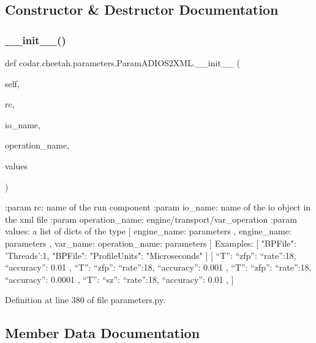 \subsection{Constructor \& Destructor Documentation}
\mbox{\label{classcodar_1_1cheetah_1_1parameters_1_1_param_a_d_i_o_s2_x_m_l_af754fa92a1b477dc6fedce88a9375d53}} 
\subsubsection{\texorpdfstring{\+\_\+\+\_\+init\+\_\+\+\_\+()}{\_\_init\_\_()}}
{\footnotesize\ttfamily def codar.\+cheetah.\+parameters.\+Param\+A\+D\+I\+O\+S2\+X\+M\+L.\+\_\+\+\_\+init\+\_\+\+\_\+ (\begin{DoxyParamCaption}\item[{}]{self,  }\item[{}]{rc,  }\item[{}]{io\+\_\+name,  }\item[{}]{operation\+\_\+name,  }\item[{}]{values }\end{DoxyParamCaption})}

\begin{DoxyVerb}:param rc: name of the run component
:param io_name: name of the io object in the xml file
:param operation_name: engine/transport/var_operation
:param values: a list of dicts of the type
[ { engine_name: {parameters} },
  { engine_name: {parameters} },
  { var_name: {operation_name: {parameters}}}
]
Examples:
[ {"BPFile": {'Threads':1}},
  {"BPFile": {"ProfileUnits": "Microseconds"}}
]
[ { “T”: { “zfp”: {“rate”:18, “accuracy”: 0.01} } },
  { “T”: { “zfp”: {“rate”:18, “accuracy”: 0.001} } },
  { “T”: { “zfp”: {“rate”:18, “accuracy”: 0.0001} } },
  { “T”: { “sz”:  {“rate”:18, “accuracy”: 0.01} } },
]
\end{DoxyVerb}
 

Definition at line 380 of file parameters.\+py.



\subsection{Member Data Documentation}
\mbox{\label{classcodar_1_1cheetah_1_1parameters_1_1_param_a_d_i_o_s2_x_m_l_a383f4e23cc27b608e08ccab3dcc9163d}} 
